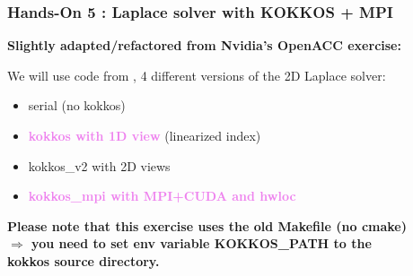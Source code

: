\begin{frame}
  \frametitle{Hands-On 5 : Laplace solver with KOKKOS + MPI}

  \hypertarget{handson5}{}
  \textbf{Slightly adapted/refactored from Nvidia's OpenACC exercise:}\\

  We will use code from , 4 different versions of the 2D Laplace solver:
  \begin{itemize}
  \item serial (no kokkos)
  \item \textcolor{violet}{\bf kokkos with 1D view} (linearized index)
  \item kokkos\_v2 with 2D views
  \item \textcolor{violet}{\bf kokkos\_mpi with MPI+CUDA and hwloc}
  \end{itemize}

  {\bf Please note that this exercise uses the old Makefile (no cmake)\\
    $\Rightarrow$ you need to set env variable KOKKOS\_PATH to the \\
    kokkos source directory.
  }
  
\end{frame}
